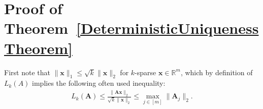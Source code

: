 \documentclass[9pt,twocolumn]{pnas-new}
\begin{document}

\section{Proof of Theorem~\ref{DeterministicUniquenessTheorem}}\label{DUT}

First note that $\|\mathbf{x}\|_1 \leq \sqrt{k} \|\mathbf{x}\|_2$ for $k$-sparse $\mathbf{x} \in \mathbb{R}^m$, which by definition of $L_k(A)$ implies the following often used inequality:
\begin{align}\label{delrho}
L_k(\mathbf{A}) \leq \frac{\|\mathbf{A}\mathbf{x}\|_2}{\sqrt{k} \|\mathbf{x}\|_2} %
\leq  \max_{j \in [m]}\|\mathbf{A}_j\|_2.
\end{align}
\end{document}
